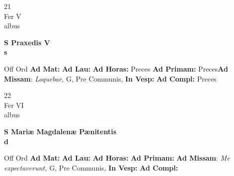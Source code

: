 \documentclass[10pt, openany]{book}
\begin{document}
    \begin{center}
        \begin{minipage}{3.5in}
            \vspace{2em}
            \begin{minipage}{0.5in}
                {\Huge 21} \\
                {\normalsize Fer V} \\
                {\normalsize albus}
            \end{minipage}
            \begin{minipage}{3.0in}
                \textbf{ \large S Praxedis V \\
                \textnormal{\normalsize s}} \\ 
            \end{minipage}
            \begin{justify}Off Ord
                \textbf{Ad Mat: }
                \textbf{Ad Lau: }
                \textbf{Ad Horas: }Preces
                \textbf{Ad Primam: }Preces\textbf{Ad Missam}: \textit{Loquebar,} G, Pre Communis,  
                \textbf{In Vesp: }
                \textbf{Ad Compl: }Preces
            \end{justify}
        \end{minipage}
    \end{center}

    \begin{center}
        \begin{minipage}{3.5in}
            \vspace{2em}
            \begin{minipage}{0.5in}
                {\Huge 22} \\
                {\normalsize Fer VI} \\
                {\normalsize albus}
            \end{minipage}
            \begin{minipage}{3.0in}
                \textbf{ \large S Mariæ Magdalenæ Pænitentis \\
                \textnormal{\normalsize d}} \\ 
            \end{minipage}
            \begin{justify}Off Ord
                \textbf{Ad Mat: }
                \textbf{Ad Lau: }
                \textbf{Ad Horas: }
                \textbf{Ad Primam: }\textbf{Ad Missam}: \textit{Me expectaverunt,} G, Pre Communis,  
                \textbf{In Vesp: }
                \textbf{Ad Compl: }
            \end{justify}
        \end{minipage}
    \end{center}
\end{document}
